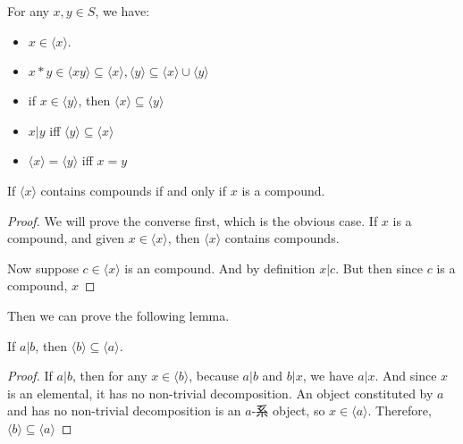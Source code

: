 \begin{theorem}\label{thm:properties-of-emergence-sets}
    For any $x,y\in S$, we have:
    \begin{itemize}
        \item $x \in \langle x \rangle$.
        \item $x*y \in \langle xy \rangle \subseteq \langle x \rangle , \langle y \rangle \subseteq \langle x \rangle \cup \langle y \rangle$
        \item if $x\in \langle y \rangle$, then $\langle x \rangle \subseteq \langle y \rangle$
        \item $x|y$ iff $\langle y \rangle \subseteq \langle x \rangle$
        \item $\langle x \rangle = \langle y \rangle$ iff $x =y$
        
                
    \end{itemize}
\end{theorem}



\begin{theorem}\label{thm:the-emergence-set-of-a-set-is-a-subset-of-the-set}
    If $\langle x \rangle$ contains compounds if and only if $x$ is a compound. 
\end{theorem}
\begin{proof}
    We will prove the converse first, which is the obvious case. If $x$ is a compound, and given $x\in \langle x \rangle$, then $\langle x \rangle$ contains compounds. 

    Now suppose $c\in \langle x \rangle$ is an compound. And by definition $x|c$. But then since $c$ is a compound, $x$ 


\end{proof}


Then we can prove the following lemma. 
\begin{lemma}\label{lem:emergence-of-a-constituted-is-emergence-of-the-constituent}
    If $a|b$, then $ \langle b \rangle \subseteq \langle a \rangle$.
\end{lemma}
\begin{proof}
    If $a|b$, then for any $x\in \langle b \rangle$, because $a|b$ and $b|x$, we have $a|x$. And since $x$ is an elemental, it has no non-trivial decomposition. An object constituted by $a$ and has no non-trivial decomposition is an $a$-系 object, so $x \in \langle a \rangle$. Therefore, $\langle b \rangle \subseteq \langle a \rangle$
\end{proof}

